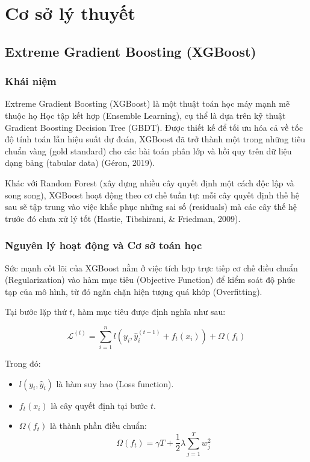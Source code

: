 \newpage
\section{Cơ sở lý thuyết}
\subsection{Extreme Gradient Boosting (XGBoost)}

\subsubsection{Khái niệm}

Extreme Gradient Boosting (XGBoost) là một thuật toán học máy mạnh mẽ thuộc họ Học tập kết hợp (Ensemble Learning), cụ thể là dựa trên kỹ thuật Gradient Boosting Decision Tree (GBDT). Được thiết kế để tối ưu hóa cả về tốc độ tính toán lẫn hiệu suất dự đoán, XGBoost đã trở thành một trong những tiêu chuẩn vàng (gold standard) cho các bài toán phân lớp và hồi quy trên dữ liệu dạng bảng (tabular data) (Géron, 2019).

Khác với Random Forest (xây dựng nhiều cây quyết định một cách độc lập và song song), XGBoost hoạt động theo cơ chế tuần tự: mỗi cây quyết định thế hệ sau sẽ tập trung vào việc khắc phục những sai số (residuals) mà các cây thế hệ trước đó chưa xử lý tốt (Hastie, Tibshirani, \& Friedman, 2009).

\subsubsection{Nguyên lý hoạt động và Cơ sở toán học}

Sức mạnh cốt lõi của XGBoost nằm ở việc tích hợp trực tiếp cơ chế điều chuẩn (Regularization) vào hàm mục tiêu (Objective Function) để kiểm soát độ phức tạp của mô hình, từ đó ngăn chặn hiện tượng quá khớp (Overfitting).

Tại bước lặp thứ $t$, hàm mục tiêu được định nghĩa như sau:

$$\mathcal{L}^{(t)} = \sum_{i=1}^{n} l\left(y_i, \hat{y}_i^{(t-1)} + f_t(x_i)\right) + \Omega(f_t)$$

Trong đó:
\begin{itemize}
    \item $l(y_i, \hat{y}_i)$ là hàm suy hao (Loss function).
    \item $f_t(x_i)$ là cây quyết định tại bước $t$.
    \item $\Omega(f_t)$ là thành phần điều chuẩn:
    $$
    \Omega(f_t) = \gamma T + \frac{1}{2}\lambda \sum_{j=1}^{T} w_j^2
    $$
\end{itemize}

